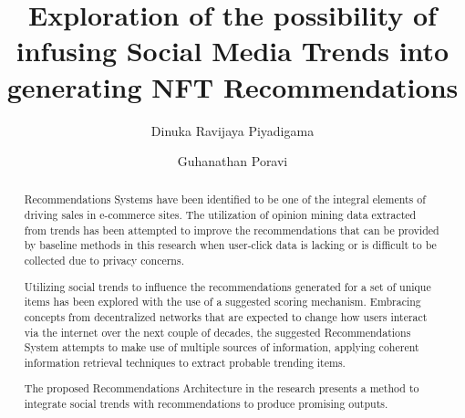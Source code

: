 \documentclass[manuscript,natbib=false, anonymous]{acmart}
\begin{document}
\title[NFT-Trends-RecSys]{Exploration of the possibility of infusing Social Media Trends into generating NFT Recommendations}

\author{Dinuka Ravijaya Piyadigama}

\author{Guhanathan Poravi}



\begin{abstract}
Recommendations Systems have been identified to be one of the integral elements of driving sales in e-commerce sites. The utilization of opinion mining data extracted from trends has been attempted to improve the recommendations that can be provided by baseline methods in this research when user-click data is lacking or is difficult to be collected due to privacy concerns.

Utilizing social trends to influence the recommendations generated for a set of unique items has been explored with the use of a suggested scoring mechanism. Embracing concepts from decentralized networks that are expected to change how users interact via the internet over the next couple of decades, the suggested Recommendations System attempts to make use of multiple sources of information, applying coherent information retrieval techniques to extract probable trending items.

The proposed Recommendations Architecture in the research presents a method to integrate social trends with recommendations to produce promising outputs.
\end{abstract}
\end{document}
